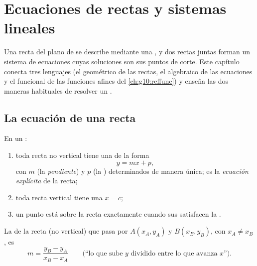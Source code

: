 \chapter{Ecuaciones de rectas y sistemas lineales}\label{ch:g10:lines}

Una recta del plano de  se describe mediante una , y dos
rectas juntas forman un sistema de ecuaciones cuyas soluciones son sus
puntos de corte. Este capítulo conecta tres lenguajes (el geométrico de las
rectas, el algebraico de las ecuaciones y el funcional de las funciones
afines del \cref{ch:g10:reffunc}) y enseña las dos maneras habituales de
resolver un .

\section{La ecuación de una recta}

\begin{theorem}\label{thm:g10:lines:reduced}
En un :
\begin{enumerate}
  \item toda recta no vertical tiene una  de la forma
        \[
        y = mx + p ,
        \]
        con $m$ (la \emph{pendiente}) y $p$ (la
        \emph{}) determinados de manera única; es la
        \emph{ecuación explícita} de la recta;
  \item toda recta vertical tiene una  $x = c$;
  \item un punto está sobre la recta exactamente cuando sus 
        satisfacen la .
\end{enumerate}
\end{theorem}
\admitted

\begin{proposition}\label{prop:g10:lines:slope}
La  de la recta (no vertical) que pasa por $A(x_A, y_A)$ y
$B(x_B, y_B)$, con $x_A \neq x_B$, es
\[
m = \frac{y_B - y_A}{x_B - x_A}
\qquad
\text{(``lo que sube $y$ dividido entre lo que avanza $x$'').}
\]
\end{proposition}

